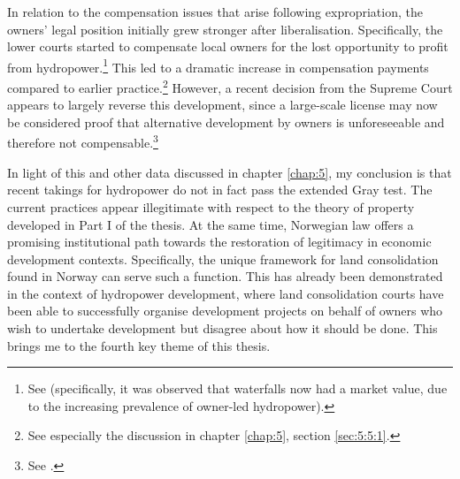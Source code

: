 In relation to the compensation issues that arise following expropriation, the owners' legal position initially grew stronger after liberalisation. Specifically, the lower courts started to compensate local owners for the lost opportunity to profit from hydropower.\footnote{See \cite{uleberg08} (specifically, it was observed that waterfalls now had a market value, due to the increasing prevalence of owner-led hydropower).} This led to a dramatic increase in compensation payments compared to earlier practice.\footnote{See especially the discussion in chapter \ref{chap:5}, section \ref{sec:5:5:1}.} However, a recent decision from the Supreme Court appears to largely reverse this development, since a large-scale license may now be considered proof that alternative development by owners is unforeseeable and therefore not compensable.\footnote{See \cite{otra13}.} 

In light of this and other data discussed in chapter \ref{chap:5}, my conclusion is that recent takings for hydropower do not in fact pass the extended Gray test. The current practices appear illegitimate with respect to the theory of property developed in Part I of the thesis. At the same time, Norwegian law offers a promising institutional path towards the restoration of legitimacy in economic development contexts. Specifically, the unique framework for land consolidation found in Norway can serve such a function. This has already been demonstrated in the context of hydropower development, where land consolidation courts have been able to successfully organise development projects on behalf of owners who wish to undertake development but disagree about how it should be done. This brings me to the fourth key theme of this thesis.

